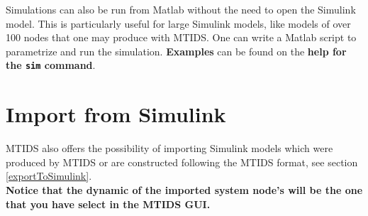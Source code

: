 \documentclass[a4paper,twoside, openright,12pt]{report}
\begin{document}
Simulations can also be run from Matlab without the need to open the Simulink model. This is particularly useful for large Simulink models, like models of over 100 nodes that
one may produce with MTIDS. One can write a Matlab script to parametrize  and run the simulation. \textbf{Examples} can be found on the \textbf{help for the \texttt{sim} command}.
% 
% 
% 
% 
% 
% 
% 
% 
% 

 


\section{Import from Simulink}

MTIDS also offers the possibility of importing Simulink models which were produced by MTIDS or are constructed following the MTIDS format, 
see section \ref{exportToSimulink}.\\

\textbf{Notice that the dynamic of the imported system node's will be the one that you have select in the MTIDS GUI.}
\\
\end{document}
